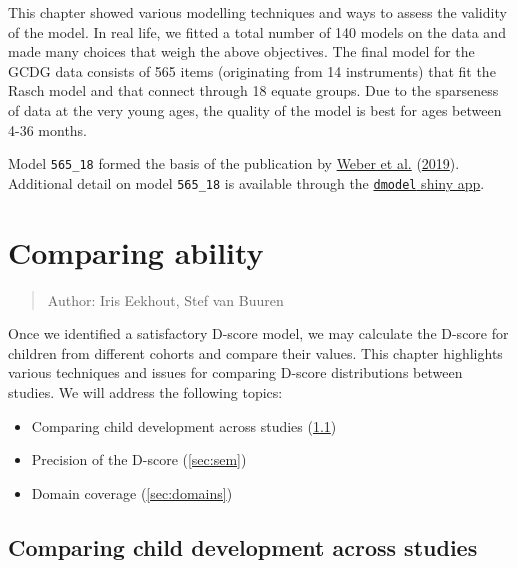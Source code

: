 \documentclass[
]{book}
\providecommand{\tightlist}{%
  \setlength{\itemsep}{0pt}\setlength{\parskip}{0pt}}
\begin{document}
This chapter showed various modelling techniques and ways to assess the validity of the model. In real life, we fitted a total number of 140 models on the data and made many choices that weigh the above objectives. The final model for the GCDG data consists of 565 items (originating from 14 instruments) that fit the Rasch model and that connect through 18 equate groups. Due to the sparseness of data at the very young ages, the quality of the model is best for ages between 4-36 months.

Model \texttt{565\_18} formed the basis of the publication by \protect\hyperlink{ref-Weber2019}{Weber et al.} (\protect\hyperlink{ref-Weber2019}{2019}). Additional detail on model \texttt{565\_18} is available through the \href{https://tnochildhealthstatistics.shinyapps.io/dmodel/}{\texttt{dmodel} shiny app}.

\hypertarget{ch:ability}{%
\chapter{Comparing ability}\label{ch:ability}}

\begin{quote}
Author: Iris Eekhout, Stef van Buuren
\end{quote}

Once we identified a satisfactory D-score model, we may calculate the D-score for children from different cohorts and compare their values. This chapter highlights various techniques and issues for comparing D-score distributions between studies. We will address the following topics:

\begin{itemize}
\tightlist
\item
  Comparing child development across studies (\ref{sec:dscores})
\item
  Precision of the D-score (\ref{sec:sem})
\item
  Domain coverage (\ref{sec:domains})
\end{itemize}

\hypertarget{sec:dscores}{%
\section{Comparing child development across studies}\label{sec:dscores}}
\end{document}

